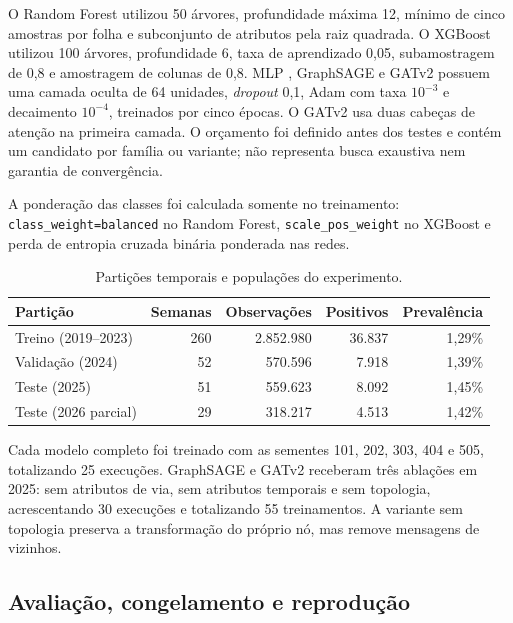 \documentclass[12pt]{article}
\begin{document}
O Random Forest \cite{breiman2001} utilizou 50 árvores, profundidade
máxima 12, mínimo de cinco amostras por folha e subconjunto de atributos
pela raiz quadrada. O XGBoost \cite{chen2016} utilizou 100 árvores,
profundidade 6, taxa de aprendizado 0,05, subamostragem de 0,8 e
amostragem de colunas de 0,8. MLP \cite{goodfellow2016}, GraphSAGE
\cite{hamilton2017} e GATv2 \cite{brody2022} possuem uma camada oculta
de 64 unidades, \textit{dropout} 0,1, Adam com taxa $10^{-3}$ e
decaimento $10^{-4}$, treinados por cinco épocas. O GATv2 usa duas
cabeças de atenção na primeira camada.
O orçamento foi definido antes dos testes e contém um candidato por
família ou variante; não representa busca exaustiva nem garantia de
convergência.

A ponderação das classes foi calculada somente no treinamento:
\texttt{class\_weight=balanced} no Random Forest,
\texttt{scale\_pos\_weight} no XGBoost e perda de entropia cruzada
binária ponderada nas redes.

\begin{table}[htbp]
\centering
\caption{Partições temporais e populações do experimento.}
\label{tab:particoes}
\small
\setlength{\tabcolsep}{5pt}
\begin{tabular}{lrrrr}
\toprule
\textbf{Partição} & \textbf{Semanas} & \textbf{Observações} &
\textbf{Positivos} & \textbf{Prevalência} \\
\midrule
Treino (2019--2023) & 260 & 2.852.980 & 36.837 & 1,29\% \\
Validação (2024) & 52 & 570.596 & 7.918 & 1,39\% \\
Teste (2025) & 51 & 559.623 & 8.092 & 1,45\% \\
Teste (2026 parcial) & 29 & 318.217 & 4.513 & 1,42\% \\
\bottomrule
\end{tabular}
\end{table}

Cada modelo completo foi treinado com as sementes 101, 202, 303, 404
e 505, totalizando 25 execuções. GraphSAGE e GATv2 receberam três
ablações em 2025: sem atributos de via, sem atributos temporais e sem
topologia, acrescentando 30 execuções e totalizando 55 treinamentos.
A variante sem topologia preserva a transformação do próprio nó, mas
remove mensagens de vizinhos.

\subsection{Avaliação, congelamento e reprodução}
\end{document}
